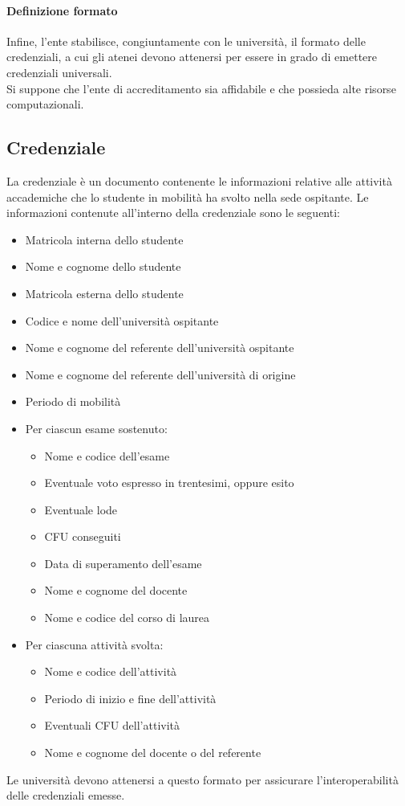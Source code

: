 \documentclass[a4paper,12pt]{article}
\begin{document}
\paragraph{Definizione formato} Infine, l'ente stabilisce, congiuntamente con le università, il formato delle credenziali, a cui gli atenei devono attenersi per essere in grado di emettere credenziali universali.
\\[0.5em]Si suppone che l'ente di accreditamento sia affidabile e che possieda alte risorse computazionali.

\subsection{Credenziale}
La credenziale è un documento contenente le informazioni relative alle attività accademiche che lo studente in mobilità ha svolto nella sede ospitante. 
\newline Le informazioni contenute all'interno della credenziale sono le seguenti:
\begin{itemize}
    \item Matricola interna dello studente
    \item Nome e cognome dello studente
    \item Matricola esterna dello studente
    \item Codice e nome dell'università ospitante
    \item Nome e cognome del referente dell'università ospitante
    \item Nome e cognome del referente dell'università di origine
    \item Periodo di mobilità
    \item Per ciascun esame sostenuto:
    \begin{itemize}[label=$\circ$]
        \item Nome e codice dell'esame
        \item Eventuale voto espresso in trentesimi, oppure esito
        \item Eventuale lode
        \item CFU conseguiti
        \item Data di superamento dell'esame
        \item Nome e cognome del docente
        \item Nome e codice del corso di laurea
    \end{itemize}
    \item Per ciascuna attività svolta:
    \begin{itemize}[label=$\circ$]
        \item Nome e codice dell'attività
        \item Periodo di inizio e fine dell'attività
        \item Eventuali CFU dell'attività
        \item Nome e cognome del docente o del referente
    \end{itemize}
\end{itemize}
Le università devono attenersi a questo formato per assicurare l'interoperabilità delle credenziali emesse.
\end{document}
